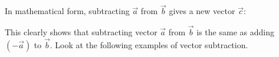        
        \label{m38813*id188962}In mathematical form, subtracting \begin{math}\stackrel{\to }{a}\end{math} from
\begin{math}\stackrel{\to }{b}\end{math} gives a new vector \begin{math}\stackrel{\to }{c}\end{math}:\par 
        \label{m38813*id189012}\nopagebreak\noindent{}
    
        
        \label{m38813*id189102}This clearly shows that subtracting vector \begin{math}\stackrel{\to }{a}\end{math} from
\begin{math}\stackrel{\to }{b}\end{math} is the same as adding \begin{math}\left(-\stackrel{\to }{a}\right)\end{math} to
\begin{math}\stackrel{\to }{b}\end{math}. Look at the following examples of vector
subtraction.\par 
        \label{m38813*id189179}
          
